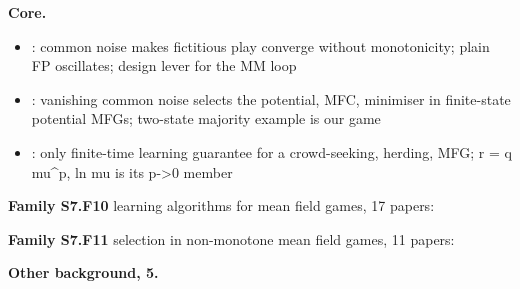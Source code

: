 \documentclass[10pt]{article}
\newcommand{\memb}[1]{\par\smallskip\textbf{#1}\quad}
\begin{document}
\memb{Core.}
\begin{itemize}[nosep,leftmargin=1.2em]
\item \citet{Delarue-exploration21}: common noise makes fictitious play converge without monotonicity; plain FP oscillates; design lever for the MM loop
\item \citet{Cecchin-selection21}: vanishing common noise selects the potential, MFC, minimiser in finite-state potential MFGs; two-state majority example is our game
\item \citet{Zeng-learning24}: only finite-time learning guarantee for a crowd-seeking, herding, MFG; r = q mu\^{}p, ln mu is its p-\textgreater{}0 member
\end{itemize}
\memb{Family S7.F10} learning algorithms for mean field games, 17 papers: {\footnotesize \citetext{\citealp{Perrin-fictitious20}; \citealp{Lauriere-learning22}; \citealp{Cardaliaguet-learning17}; \citealp{Guo-learning19}; \citealp{Hadikhanloo-finite19}; \citealp{Cui-approximately21}; \citealp{Perrin-mean21}; \citealp{Lauriere-scalable22}; \citealp{Lavigne-generalized22}; \citealp{Perolat-scaling22}; \citealp{Guo-general23}; \citealp{Guo-mesob23}; \citealp{Yardim-policy23}; \citealp{Dayanikli-machine24}; \citealp{Hu-mfoml24}; \citealp{Isobe-last24}; \citealp{Yardim-when24}}}

\memb{Family S7.F11} selection in non-monotone mean field games, 11 papers: {\footnotesize \citetext{\citealp{Delarue-exploration21}; \citealp{Cecchin-selection21}; \citealp{Zeng-learning24}; \citealp{Briani-stable17}; \citealp{Delarue-selection20}; \citealp{Bayraktar-non19}; \citealp{Bayraktar-finite19}; \citealp{Li-linear22}; \citealp{Bardi-long23}; \citealp{Eich-bounded25}; \citealp{Graber-trembling25}}}

\memb{Other background, 5.} {\footnotesize \citetext{\citealp{Guo-mfomo22}; \citealp{Hofer-optimal24}; \citealp{Aydin-variational26}; \citealp{Guo-limit26}; \citealp{Magnino-bench26}}}
\end{document}
